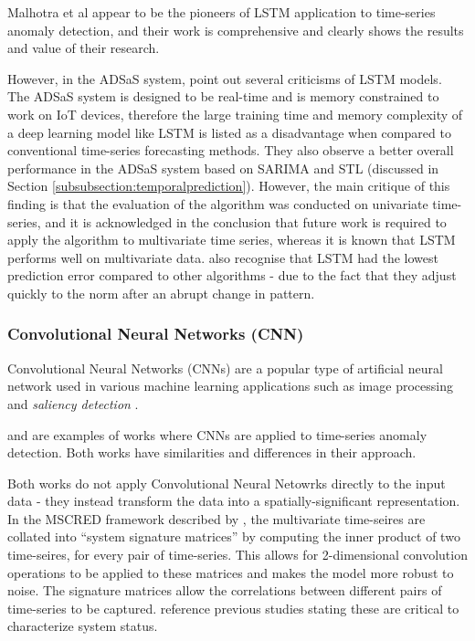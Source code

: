 \documentclass{mproj}
\begin{document}
Malhotra et al appear to be the pioneers of LSTM application to time-series anomaly detection, and their work is comprehensive and clearly shows the results and value of their research.

However, in the ADSaS system, \cite{ADSaS} point out several criticisms of LSTM models. The ADSaS system is designed to be real-time and is memory constrained to work on IoT devices, therefore the large training time and memory complexity of a deep learning model like LSTM is listed as a disadvantage when compared to conventional time-series forecasting methods. They also observe a better overall performance in the ADSaS system based on SARIMA and STL (discussed in Section \ref{subsubsection:temporalprediction}). However, the main critique of this finding is that the evaluation of the algorithm was conducted on univariate time-series, and it is acknowledged in the conclusion that future work is required to apply the algorithm to multivariate time series, whereas it is known that LSTM performs well on multivariate data. \cite{ADSaS} also recognise that LSTM had the lowest prediction error compared to other algorithms - due to the fact that they adjust quickly to the norm after an abrupt change in pattern.

\subsubsection{Convolutional Neural Networks (CNN)}

Convolutional Neural Networks (CNNs) are a popular type of artificial neural network used in various machine learning applications such as image processing and \textit{saliency detection} \citep{MicrosoftTimeSeries}.

\cite{deepMultivariateNetwork} and \cite{MicrosoftTimeSeries} are examples of works where CNNs are applied to time-series anomaly detection. Both works have similarities and differences in their approach.

Both works do not apply Convolutional Neural Netowrks directly to the input data - they instead transform the data into a spatially-significant representation.
In the MSCRED framework described by \cite{deepMultivariateNetwork}, the multivariate time-seires are collated into ``system signature matrices'' by computing the inner product of two time-seires, for every pair of time-series. This allows for 2-dimensional convolution operations to be applied to these matrices and makes the model more robust to noise. The signature matrices allow the correlations between different pairs of time-series to be captured. \cite{deepMultivariateNetwork} reference previous studies stating these are critical to characterize system status.
\end{document}

